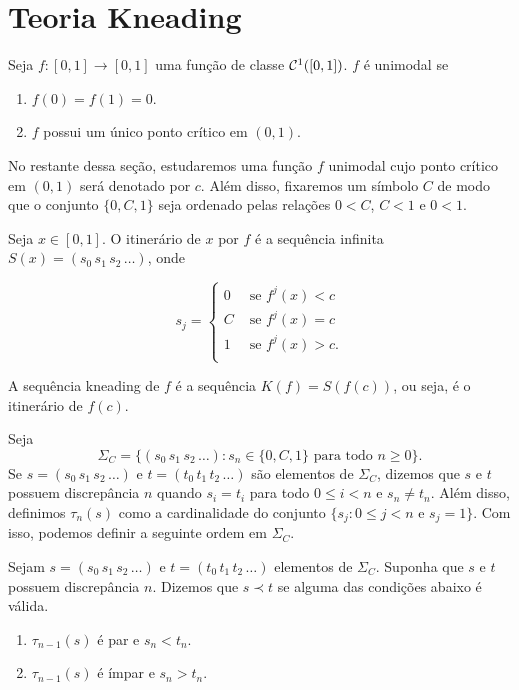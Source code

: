 \section{Teoria Kneading}

\begin{definition}
Seja $f: [0, 1] \to [0, 1]$ uma função de classe $\mathcal{C}^1([0, 1])$. $f$ é unimodal se
\begin{enumerate}
\item $f(0) = f(1) = 0$.
\item $f$ possui um único ponto crítico em $(0, 1)$.
\end{enumerate}
\end{definition}

No restante dessa seção, estudaremos uma função $f$ unimodal cujo ponto crítico em $(0, 1)$ será denotado por $c$. Além disso, fixaremos um símbolo $C$ de modo que o conjunto $\{0, C, 1\}$ seja ordenado pelas relações $0 < C$, $C < 1$ e $0 < 1$.

\begin{definition}
Seja $x \in [0, 1]$. O itinerário de $x$ por $f$ é a sequência infinita $S(x) = (s_0 \, s_1 \, s_2 \, \dots)$, onde

\[ s_j = 
\begin{cases} 
  0 & \text{ se } f^j(x) < c \\
  C & \text{ se } f^j(x) = c \\
  1 & \text{ se } f^j(x) > c. \\
\end{cases}
\]
\end{definition}

\begin{definition}
A sequência kneading de $f$ é a sequência $K(f) = S(f(c))$, ou seja, é o itinerário de $f(c)$.
\end{definition}

Seja $$\Sigma_C = \{ (s_0\, s_1\, s_2\, \dots) : s_n \in \{0, C, 1\} \text{ para todo } n \geq 0\}.$$ Se $s = (s_0\, s_1\, s_2\, \dots)$ e $t = (t_0\, t_1\, t_2\, \dots)$ são elementos de $\Sigma_C$, dizemos que $s$ e $t$ possuem discrepância $n$ quando $s_i = t_i$ para todo $0 \leq i < n$ e $s_n \neq t_n$. Além disso, definimos $\tau_n(s)$ como a cardinalidade do conjunto $\{ s_j : 0 \leq j < n \text{ e } s_j = 1 \}$. Com isso, podemos definir a seguinte ordem em $\Sigma_C$.

\begin{definition}
Sejam $s = (s_0\, s_1\, s_2\, \dots)$ e $t = (t_0\, t_1\, t_2\, \dots)$ elementos de $\Sigma_C$. Suponha que $s$ e $t$ possuem discrepância $n$. Dizemos que $s \prec t$ se alguma das condições abaixo é válida.
\begin{enumerate}
\item $\tau_{n-1}(s)$ é par e $s_n < t_n$.
\item $\tau_{n-1}(s)$ é ímpar e $s_n > t_n$.
\end{enumerate}
\end{definition}


